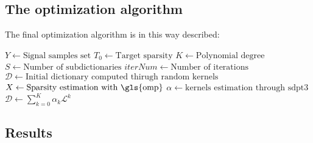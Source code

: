\subsection{The optimization algorithm}
The final optimization algorithm is in this way described:
\begin{algorithm}[H]
  \begin{algorithmic}[1]
      \State $Y \gets \text{Signal samples set}$
      \State $T_0\gets \text{Target sparsity}$
      \State $K \gets \text{Polynomial degree}$
      \State $S \gets \text{Number of subdictionaries}$
      \State $iterNum \gets \text{Number of iterations}$
      \State $\mathcal{D} \gets \text{Initial dictionary computed thirugh random kernels}$
    \EndProcedure
        \State {}
        \State $X \gets \text{Sparsity estimation with \gls{omp}}$
      \EndProcedure
        $\alpha \gets \text{kernels estimation through sdpt3}$
      \EndProcedure
        \State $\mathcal{D} \gets \sum_{k=0}^K \alpha_k \mathcal{L}^k$
      \EndProcedure
    \EndFor
  \end{algorithmic}
\end{algorithm}

\subsection{Results}
\label{sec:dataGen}
